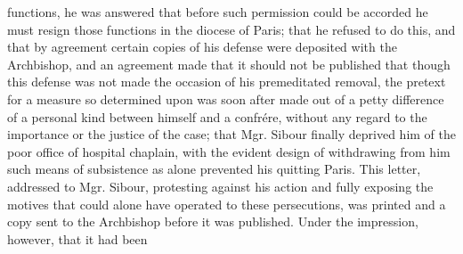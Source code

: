 functions, he was answered that before such permission could be accorded he must resign those functions in the diocese of Paris; that he refused to do this, and that by agreement certain copies of his defense were deposited with the Archbishop, and an agreement made that it should not be published that though this defense was not made the occasion of his premeditated removal, the pretext for a measure so determined upon was soon after made out of a petty difference of a personal kind between himself and a confrére, without any regard to the importance or the justice of the case; that Mgr. Sibour finally deprived him of the poor office of hospital chaplain, with the evident design of withdrawing from him such means of subsistence as alone prevented his quitting Paris. This letter, addressed to Mgr. Sibour, protesting against his action and fully exposing the motives that could alone have operated to these persecutions, was printed and a copy sent to the Archbishop before it was published. Under the impression, however, that it had been


